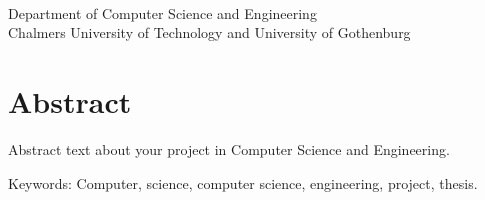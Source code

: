 \titleA{}\\
\titleB{}\\
\me{}\\
Department of Computer Science and Engineering\\
Chalmers University of Technology and University of Gothenburg
\vspace{0.5cm}

\thispagestyle{plain}			%
\vspace{0pt plus 1.0pt}
\section*{Abstract}
Abstract text about your project in  Computer Science and Engineering.

\vfill
Keywords: Computer, science, computer science, engineering, project, thesis.

\newpage				%
\thispagestyle{empty}
\mbox{}
